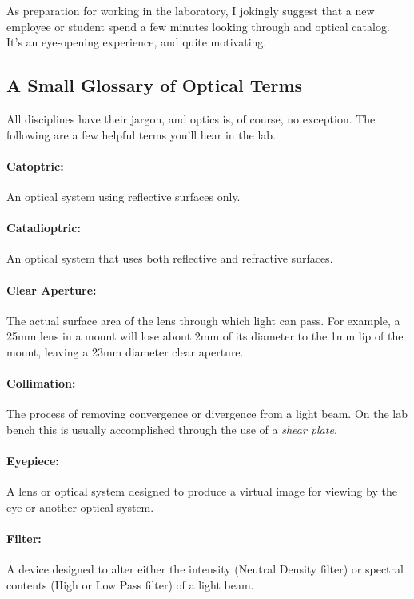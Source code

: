 \documentclass[11pt]{article}
\begin{document}
As preparation for working in the laboratory, I jokingly suggest that a new employee or student spend a few minutes looking through and optical catalog. It's an eye-opening experience, and quite motivating.

\subsection{A Small Glossary of Optical Terms}

All disciplines have their jargon, and optics is, of course, no exception. The following are a few helpful terms you'll hear in the lab.

\paragraph{Catoptric:}An optical system using reflective surfaces only.
\vspace{-10pt}
\paragraph{Catadioptric:}
An optical system that uses both reflective and refractive surfaces.
\vspace{-10pt}
\paragraph{Clear Aperture:} The actual surface area of the lens through which light can pass. For example, a 25mm lens in a mount will lose about 2mm of its diameter to the 1mm lip of the mount, leaving a 23mm diameter clear aperture.
\vspace{-10pt}
\paragraph{Collimation:}
The process of removing convergence or divergence from a light beam. On the lab bench this is usually accomplished through the use of a \textit{shear plate}.
\vspace{-10pt}
\paragraph{Eyepiece:} A lens or optical system designed to produce a virtual image for viewing by the eye or another optical system.
\vspace{-10pt}
\paragraph{Filter:} A device designed to alter either the intensity (Neutral Density filter) or spectral contents (High or Low Pass filter) of a light beam.
\vspace{-10pt}
\end{document}
